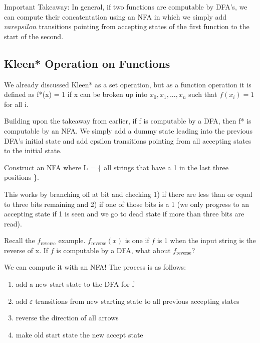 Important Takeaway: In general, if two functions are computable by DFA's, we can compute their concatentation using an NFA in which we simply add $varepsilon$ transitions pointing from accepting states of the first function to the start of the second.
\begin{center}
\end{center}

\subsection*{Kleen* Operation on Functions}
We already discussed Kleen* as a set operation, but as a function operation it is defined as f*(x) = 1 if x can be broken up into $x_0, x_1, ..., x_n$ such that $f(x_i) = 1$ for all i.

Building upon the takeaway from earlier, if f is computable by a DFA, then f* is computable by an NFA. We simply add a dummy state leading into the previous DFA's initial state and add epsilon transitions pointing from all accepting states to the initial state.
\begin{center}
\end{center}

\begin{example}
    Construct an NFA where L = \{ all strings that have a 1 in the last three positions \}.

    \begin{center}
    \end{center}

    This works by branching off at bit and checking 1) if there are less than or equal to three bits remaining and 2) if one of those bits is a 1 (we only progress to an accepting state if 1 is seen and we go to dead state if more than three bits are read).
\end{example}

\hr 

Recall the $f_{\text{reverse}}$ example. $f_{\text{reverse}}(x)$ is one if $f$ is 1 when the input string is the reverse of x. If $f$ is computable by a DFA, what about $f_{\text{reverse}}$? 

We can compute it with an NFA! The process is as follows:
\begin{enumerate}
    \item add a new start state to the DFA for f
    \item add $\varepsilon$ transitions from new starting state to all previous accepting states
    \item reverse the direction of all arrows
    \item make old start state the new accept state
\end{enumerate}


